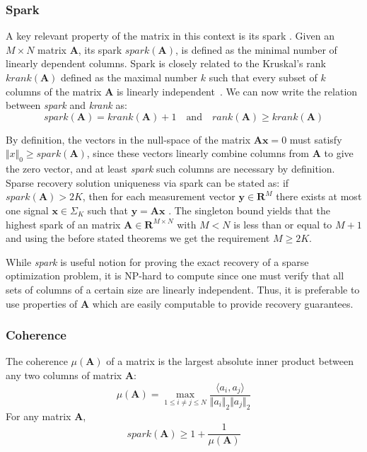 \documentclass[journal]{IEEEtran}
\begin{document}
\subsubsection{Spark}
A key relevant property of the matrix in this context is its spark \cite{donoho2003optimally}. Given an $M\times N$ matrix $\boldsymbol{A}$, its spark $spark(\boldsymbol{A})$, is defined as the minimal number of linearly dependent columns. Spark is closely related to the Kruskal's rank $krank(\boldsymbol{A})$ defined as the maximal number $k$ such that every subset of $k$ columns of the matrix $\boldsymbol{A}$ is linearly independent~\cite{kruskal1977three}. We can now write the relation between \textit{spark} and \textit{krank} as:
%
\begin{equation} \label{eq:skrank}
	spark(\boldsymbol{A})=krank(\boldsymbol{A})+1\quad \text{and} \quad rank(\boldsymbol{A})\geq krank(\boldsymbol{A})
\end{equation}

By definition, the vectors in the null-space of the matrix $\boldsymbol{A}\boldsymbol{x}=0$ must satisfy $\Vert x\Vert_0\geq spark(\boldsymbol{A})$, since these vectors linearly combine columns from $\boldsymbol{A}$ to give the zero vector, and at least \textit{spark} such columns are necessary by definition. Sparse recovery solution uniqueness via spark can be stated as: if $spark(\boldsymbol{A})>2K$, then for each measurement vector $\boldsymbol{y}\in\mathbf{R}^M$ there exists at most one signal $\boldsymbol{x}\in\Sigma_K$ such that $\boldsymbol{y}=\boldsymbol{A}\boldsymbol{x}$ \cite{Rish2015}. The singleton bound yields that the highest spark of an matrix $\boldsymbol{A}\in\mathbf{R}^{M\times N}$ with $M<N$ is less than or equal to $M+1$ and using the before stated theorems we get the requirement $M\geq 2K$.

While \textit{spark} is useful notion for proving the exact recovery of a sparse optimization problem, it is NP-hard to compute since one must verify that all sets of columns of a certain size are linearly independent. Thus, it is preferable to use properties of $\boldsymbol{A}$ which are easily computable to provide recovery guarantees.

\subsubsection{Coherence}
The coherence $\mu(\boldsymbol{A})$ of a matrix is the largest absolute inner product between any two columns of matrix $\boldsymbol{A}$:
%
\begin{equation} \label{eq:coherence}
	\mu(\boldsymbol{A})=\max\limits_{1\leq i\neq j\leq N}\frac{\langle a_i,
		a_j\rangle}{\Vert a_i\Vert_2 \Vert a_j\Vert_2}
\end{equation}
%
For any matrix $\boldsymbol{A}$,
\begin{equation} \label{eq:coherence_spark}
	spark(\boldsymbol{A})\geq 1+\frac{1}{\mu(\boldsymbol{A})}
\end{equation}
\end{document}
